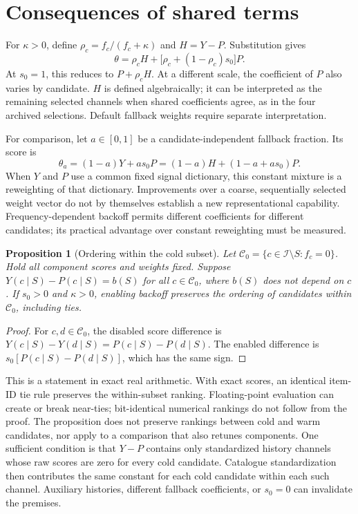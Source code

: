 \documentclass[11pt,a4paper]{article}
\newtheorem{proposition}{Proposition}
\newcommand{\I}{\mathcal I}
\begin{document}
\section{Consequences of shared terms}
For $\kappa>0$, define $\rho_c=f_c/(f_c+\kappa)$ and $H=Y-P$. Substitution gives
\begin{equation}\label{sharedidentity}
 \theta=\rho_cH+\bigl[\rho_c+(1-\rho_c)s_0\bigr]P.
\end{equation}
At $s_0=1$, this reduces to $P+\rho_cH$. At a different scale, the coefficient of
$P$ also varies by candidate. $H$ is defined algebraically; it can be interpreted
as the remaining selected channels when shared coefficients agree, as in the four
archived selections. Default fallback weights require separate interpretation.

For comparison, let $a\in[0,1]$ be a candidate-independent fallback fraction. Its score is
\[
 \theta_a=(1-a)Y+as_0P=(1-a)H+(1-a+as_0)P.
\]
When $Y$ and $P$ use a common fixed signal dictionary, this constant mixture is a
reweighting of that dictionary. Improvements over a coarse, sequentially selected
weight vector do not by themselves establish a new representational capability.
Frequency-dependent backoff permits different coefficients for different candidates;
its practical advantage over constant reweighting must be measured.

\begin{proposition}[Ordering within the cold subset]
Let $\mathcal C_0=\{c\in\I\setminus S:f_c=0\}$. Hold all component scores and
weights fixed. Suppose $Y(c\mid S)-P(c\mid S)=b(S)$ for all $c\in\mathcal C_0$,
where $b(S)$ does not depend on $c$. If $s_0>0$ and $\kappa>0$, enabling backoff
preserves the ordering of candidates within $\mathcal C_0$, including ties.
\end{proposition}
\begin{proof}
For $c,d\in\mathcal C_0$, the disabled score difference is
$Y(c\mid S)-Y(d\mid S)=P(c\mid S)-P(d\mid S)$. The enabled difference is
$s_0[P(c\mid S)-P(d\mid S)]$, which has the same sign.
\end{proof}
This is a statement in exact real arithmetic. With exact scores, an identical
item-ID tie rule preserves the within-subset ranking. Floating-point evaluation can
create or break near-ties; bit-identical numerical rankings do not follow from the proof.
The proposition does not preserve rankings between cold and warm candidates, nor
apply to a comparison that also retunes components. One sufficient condition is
that $Y-P$ contains only standardized history channels whose raw scores are zero
for every cold candidate. Catalogue standardization then contributes the same
constant for each cold candidate within each such channel. Auxiliary histories,
different fallback coefficients, or $s_0=0$ can invalidate the premises.
\end{document}
